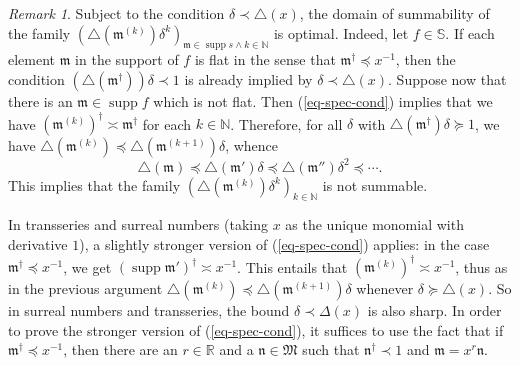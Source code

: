 \documentclass{article}
\newcommand{\tmop}[1]{\ensuremath{\operatorname{#1}}}
\theoremstyle{remark}\newtheorem*{convention*}{Convention}
\newtheorem{remark}[theorem]{Remark}
\begin{document}
\begin{remark}
  \label{rem-radius}Subject to the condition $\delta \prec \triangle (x)$, the
  domain of summability of the family $(\triangle (\mathfrak{m}^{(k)})
  \delta^k)_{\mathfrak{m} \in \tmop{supp} s \wedge k \in \mathbb{N}}$ is
  optimal. Indeed, let $f \in \mathbb{S}$. If each element $\mathfrak{m}$ in
  the support of $f$ is flat in the sense that $\mathfrak{m}^{\dag}
  \preccurlyeq x^{- 1}$, then the condition $(\triangle (\mathfrak{m}^{\dag}))
  \delta \prec 1$ is already implied by $\delta \prec \triangle (x)$. Suppose
  now that there is an $\mathfrak{m} \in \tmop{supp} f$ which is not flat.
  Then (\ref{eq-spec-cond}) implies that we have $(\mathfrak{m}^{(k)})^{\dag}
  \asymp \mathfrak{m}^{\dag}$ for each $k \in \mathbb{N}$. Therefore, for all
  $\delta$ with $\triangle (\mathfrak{m}^{\dag}) \delta \succcurlyeq 1$, we
  have $\triangle (\mathfrak{m}^{(k)}) \preccurlyeq \triangle
  (\mathfrak{m}^{(k + 1)}) \delta$, whence
  \[ \triangle (\mathfrak{m}) \preccurlyeq \triangle (\mathfrak{m}') \delta
     \preccurlyeq \triangle (\mathfrak{m}'') \delta^2 \preccurlyeq \cdots . \]
  This implies that the family $(\triangle (\mathfrak{m}^{(k)}) \delta^k)_{k
  \in \mathbb{N}}$ is not summable.
  
  In transseries and surreal numbers (taking $x$ as the unique monomial with
  derivative $1$), a slightly stronger version of (\ref{eq-spec-cond}) applies:
  in the case $\mathfrak{m}^{\dag} \preccurlyeq x^{- 1}$, we get $(\tmop{supp}
  \mathfrak{m}')^{\dag} \asymp x^{- 1}$. This entails that
  $(\mathfrak{m}^{(k)})^{\dag} \asymp x^{- 1}$, thus as in the previous
  argument $\triangle (\mathfrak{m}^{(k)}) \preccurlyeq \triangle
  (\mathfrak{m}^{(k + 1)}) \delta$ whenever $\delta \succcurlyeq \triangle
  (x)$. So in surreal numbers and transseries, the bound $\delta \prec \Delta
  (x)$ is also sharp. In order to prove the stronger version of
  (\ref{eq-spec-cond}), it suffices to use the fact that if
  $\mathfrak{m}^{\dag} \preccurlyeq x^{- 1}$, then there are an $r \in
  \mathbb{R}$ and a $\mathfrak{n} \in \mathfrak{M}$ such that
  $\mathfrak{n}^{\dag} \prec 1$ and $\mathfrak{m}= x^r \mathfrak{n}$.
\end{remark}
\end{document}
